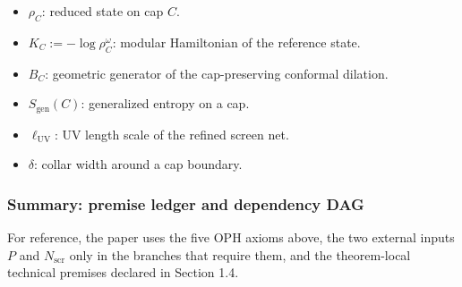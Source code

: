 \begin{itemize}
\tightlist
\item
  \(\rho_C\): reduced state on cap \(C\).
\item
  \(K_C := -\log \rho_C^{\omega}\): modular Hamiltonian of the reference state.
\item
  \(B_C\): geometric generator of the cap-preserving conformal dilation.
\item
  \(S_{\mathrm{gen}}(C)\): generalized entropy on a cap.
\item
  \(\ell_{\mathrm{UV}}\): UV length scale of the refined screen net.
\item
  \(\delta\): collar width around a cap boundary.
\end{itemize}

\subsubsection{Summary: premise ledger and dependency DAG}\label{16-summary-complete-axiom-set}

For reference, the paper uses the five OPH axioms above, the two external inputs \(P\) and \(N_{\mathrm{scr}}\) only in the branches that require them, and the theorem-local technical premises declared in Section 1.4.

